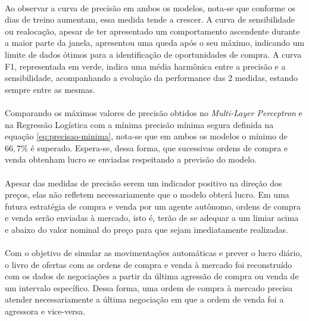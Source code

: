 \documentclass[grad,numbers]{coppe}
\begin{document}
            \paragraph{}Ao observar a curva de precisão em ambos os modelos, nota-se que conforme os dias de treino aumentam, essa medida tende a crescer. A curva de sensibilidade ou realocação, apesar de ter apresentado um comportamento ascendente durante a maior parte da janela, apresentou uma queda após o seu máximo, indicando um limite de dados ótimos para a identificação de oportunidades de compra. A curva F1, representada em verde, indica uma média harmônica entre a precisão e a sensibilidade, acompanhando a evolução da performance das 2 medidas, estando sempre entre as mesmas.
            
            \paragraph{}Comparando os máximos valores de precisão obtidos no \textit{Multi-Layer Perceptron} e na Regressão Logística com a mínima precisão mínima segura definida na equação \ref{eq:precisao-minima}, nota-se que em ambos os modelos o mínimo de $66,7\%$ é superado. Espera-se, dessa forma, que sucessivas ordens de compra e venda obtenham lucro se enviadas respeitando a previsão do modelo.
            
            
            \paragraph{}Apesar das medidas de precisão serem um indicador positivo na direção dos preços, elas não refletem necessariamente que o modelo obterá lucro. Em uma futura estratégia de compra e venda por um agente autônomo, ordens de compra e venda serão enviadas à mercado, isto é, terão de se adequar a um limiar acima e abaixo do valor nominal do preço para que sejam imediatamente realizadas. 
            
            \paragraph{}Com o objetivo de simular as movimentações automáticas e prever o lucro diário, o livro de ofertas com as ordens de compra e venda à mercado foi reconstruído com os dados de negociações a partir da última agressão de compra ou venda de um intervalo específico. Dessa forma, uma ordem de compra à mercado precisa atender necessariamente a última negociação em que a ordem de venda foi a agressora e vice-versa.
            
\end{document}
